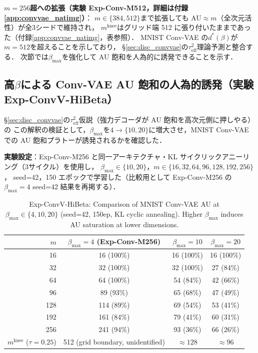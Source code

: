 \documentclass[11pt,a4paper]{jsarticle}
\newcommand{\mknee}{m^{\mathrm{knee}}}
\begin{document}
\textbf{$m=256$超への拡張（実験 Exp-Conv-M512，詳細は付録\ref{app:convvae_natimg}）}：
$m \in \{384, 512\}$まで拡張しても AU$\approx m$（全次元活性）が全3シードで維持され，
$\mknee$はグリッド端 512 に張り付いたままであった（付録\ref{app:convvae_natimg}，表参照）．
MNIST Conv-VAE の$d^*(\beta)$が$m=512$を超えることを示しており，
§\ref{sec:disc_convvae}の$\tau^2_\mathrm{eff}$理論予測と整合する．
次節では$\beta_{\max}$を強化して AU 飽和を人為的に誘発できることを示す．

\subsection{高$\beta$による Conv-VAE AU 飽和の人為的誘発（実験 Exp-ConvV-HiBeta）}\label{sec:exp_hibeta}

§\ref{sec:disc_convvae}の$\tau^2_\mathrm{eff}$仮説（強力デコーダが AU 飽和を高次元側に押しやる）の
この解釈の検証として，$\beta_{\max}$を$4 \to \{10, 20\}$に増大させ，MNIST Conv-VAE での
AU 飽和プラトーが誘発されるかを確認した．

\textbf{実験設定}：Exp-Conv-M256 と同一アーキテクチャ・KL サイクリックアニーリング（3サイクル）を使用し，
$\beta_{\max} \in \{10, 20\}$，$m \in \{16, 32, 64, 96, 128, 192, 256\}$，
seed=42，150 エポックで学習した（比較用として Exp-Conv-M256 の$\beta_{\max}=4$ seed=42 結果を再掲する）．

\begin{table}[H]
\centering
\caption{Exp-ConvV-HiBeta: Comparison of MNIST Conv-VAE AU at $\beta_\mathrm{max} \in \{4, 10, 20\}$ (seed=42, 150ep, KL cyclic annealing). Higher $\beta_\mathrm{max}$ induces AU saturation at lower dimensions.}
\label{tab:hibeta}
\small
\begin{tabular}{r ccc}
\toprule
$m$ & $\beta_{\max}=4$ (Exp-Conv-M256) & $\beta_{\max}=10$ & $\beta_{\max}=20$ \\
\midrule
 16  & 16  (100\%)& 16 (100\%) & 16 (100\%) \\
 32  & 32  (100\%)& 32 (100\%) & 27 (84\%)  \\
 64  & 64  (100\%)& 54 (84\%)  & 42 (66\%)  \\
 96  & 89  (93\%) & 65 (68\%)  & 47 (49\%)  \\
128  & 114 (89\%) & 69 (54\%)  & 53 (41\%)  \\
192  & 161 (84\%) & 79 (41\%)  & 60 (31\%)  \\
256  & 241 (94\%) & 93 (36\%)  & 66 (26\%)  \\
\midrule
$\mknee$ ($\tau=0.25$) & 512 (grid boundary, unidentified) & $\approx 128$ & $\approx 96$ \\
\bottomrule
\end{tabular}
\end{table}
\end{document}
